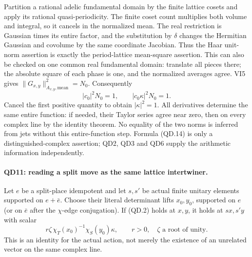 Partition a rational adelic fundamental domain by the finite
lattice cosets and apply its rational quasi-periodicity.  The
finite coset count multiplies both volume and integral, so it
cancels in the normalized mean.  The real restriction is
Gaussian times its entire factor, and the substitution by
$\delta$ changes the Hermitian Gaussian and covolume by the
same coordinate Jacobian.  Thus the Haar unit-norm assertion
is exactly the period-lattice mean-square assertion.  This
can also be checked on one common real fundamental domain:
translate all pieces there; the absolute square of each phase
is one, and the normalized averages agree.  VI5 gives
$\|G_{x,y}\|_{A_{x,y},\mathrm{mean}}^2=N_0$.  Consequently
\[
                   |c_0|^2N_0=1,
                   \qquad |c_0\kappa|^2N_0=1.             \tag{QD.14}
\]
Cancel the first positive quantity to obtain $|\kappa|^2=1$.
All derivatives determine the same entire function: if needed,
their Taylor series agree near zero, then on every complex line
by the identity theorem.  No equality of the two norms is
inferred from jets without this entire-function step.  Formula
(QD.14) is only a distinguished-complex assertion; QD2, QD3
and QD6 supply the arithmetic information independently.

\paragraph{QD11: reading a split move as the same lattice intertwiner.}
Let $e$ be a split-place idempotent and let $s,s'$ be actual
finite unitary elements supported on $e+\bar e$.  Choose their
literal determinant lifts $x_0,y_0$, supported on $e$ (or on
$\bar e$ after the $\chi$-edge conjugation).  If (QD.2) holds
at $x,y$, it holds at $sx,s'y$ with scalar
\[
       r\zeta\,\chi_T(x_0)^{-1}\chi_S(y_0)\kappa,
                 \qquad r>0,\quad \zeta\text{ a root of unity}.
                                                               \tag{QD.15}
\]
This is an identity for the actual action, not merely the
existence of an unrelated vector on the same complex line.

